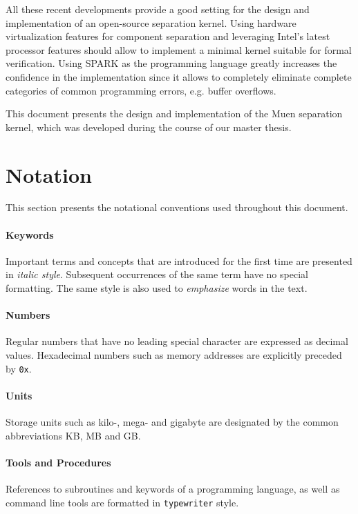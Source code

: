 All these recent developments provide a good setting for the design and
implementation of an open-source separation kernel. Using hardware
virtualization features for component separation and leveraging Intel's latest
processor features should allow to implement a minimal kernel suitable for
formal verification. Using SPARK as the programming language greatly increases
the confidence in the implementation since it allows to completely eliminate
complete categories of common programming errors, e.g. buffer overflows.

This document presents the design and implementation of the Muen separation
kernel, which was developed during the course of our master thesis.

\section{Notation}
This section presents the notational conventions used throughout this document.

\paragraph{Keywords}
Important terms and concepts that are introduced for the first time are
presented in \emph{italic style}. Subsequent occurrences of the same term have
no special formatting. The same style is also used to \emph{emphasize} words in
the text.

\paragraph{Numbers}
Regular numbers that have no leading special character are expressed as decimal
values. Hexadecimal numbers such as memory addresses are explicitly preceded by
\texttt{0x}.

\paragraph{Units}
Storage units such as kilo-, mega- and gigabyte are designated by
the common abbreviations KB, MB and GB.

\paragraph{Tools and Procedures}
References to subroutines and keywords of a programming language, as well as
command line tools are formatted in \texttt{typewriter} style.

